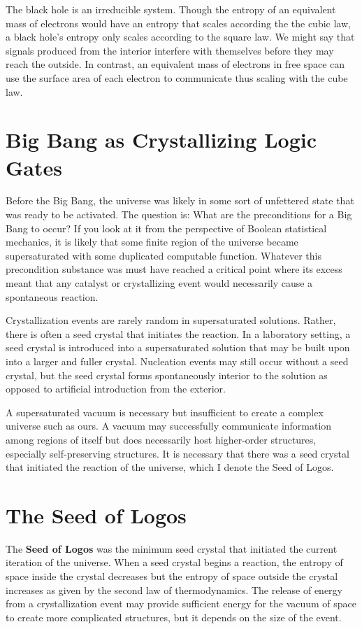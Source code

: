 \documentclass[10pt, a5paper, twoside, openright]{memoir}
\begin{document}
The black hole is an irreducible system. Though the entropy of an equivalent mass of electrons would have an entropy that scales according the the cubic law, a black hole's entropy only scales according to the square law. We might say that signals produced from the interior interfere with themselves before they may reach the outside. In contrast, an equivalent mass of electrons in free space can use the surface area of each electron to communicate thus scaling with the cube law.

\section{Big Bang as Crystallizing Logic Gates}
Before the Big Bang, the universe was likely in some sort of unfettered state that was ready to be activated. The question is: What are the preconditions for a Big Bang to occur? If you look at it from the perspective of Boolean statistical mechanics, it is likely that some finite region of the universe became supersaturated with some duplicated computable function. Whatever this precondition substance was must have reached a critical point where its excess meant that any catalyst or crystallizing event would necessarily cause a spontaneous reaction.

Crystallization events are rarely random in supersaturated solutions. Rather, there is often a seed crystal that initiates the reaction. In a laboratory setting, a seed crystal is introduced into a supersaturated solution that may be built upon into a larger and fuller crystal. Nucleation events may still occur without a seed crystal, but the seed crystal forms spontaneously interior to the solution as opposed to artificial introduction from the exterior.

A supersaturated vacuum is necessary but insufficient to create a complex universe such as ours. A vacuum may successfully communicate information among regions of itself but does necessarily host higher-order structures, especially self-preserving structures. It is necessary that there was a seed crystal that initiated the reaction of the universe, which I denote the Seed of Logos.

\section{The Seed of Logos}
The \textbf{Seed of Logos} was the minimum seed crystal that initiated the current iteration of the universe. When a seed crystal begins a reaction, the entropy of space inside the crystal decreases but the entropy of space outside the crystal increases as given by the second law of thermodynamics. The release of energy from a crystallization event may provide sufficient energy for the vacuum of space to create more complicated structures, but it depends on the size of the event.
\end{document}
